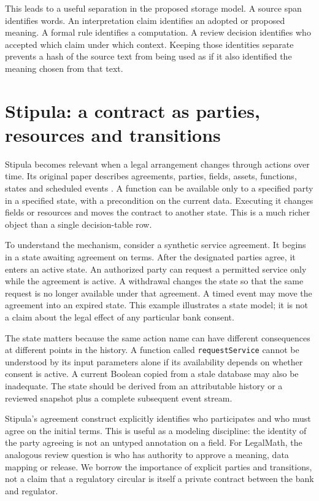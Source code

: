 \documentclass[12pt,a4paper,oneside,openany]{book}
\begin{document}
This leads to a useful separation in the proposed storage model. A source span
identifies words. An interpretation claim identifies an adopted or proposed
meaning. A formal rule identifies a computation. A review decision identifies
who accepted which claim under which context. Keeping those identities
separate prevents a hash of the source text from being used as if it also
identified the meaning chosen from that text.

\section{Stipula: a contract as parties, resources and transitions}
\label{sec:languages-stipula}
Stipula becomes relevant when a legal arrangement changes through actions over
time. Its original paper describes agreements, parties, fields, assets,
functions, states and scheduled events \citep[secs.~3--6]{stipula2021}. A
function can be available only to a specified party in a specified state, with
a precondition on the current data. Executing it changes fields or resources
and moves the contract to another state. This is a much richer object than
a single decision-table row.

To understand the mechanism, consider a synthetic service agreement. It begins
in a state awaiting agreement on terms. After the designated parties agree,
it enters an active state. An authorized party can request a permitted service
only while the agreement is active. A withdrawal changes the state so that
the same request is no longer available under that agreement. A timed event
may move the agreement into an expired state. This example illustrates a state
model; it is not a claim about the legal effect of any particular bank consent.

The state matters because the same action name can have different consequences
at different points in the history. A function called \texttt{requestService}
cannot be understood by its input parameters alone if its availability depends
on whether consent is active. A current Boolean copied from a stale database
may also be inadequate. The state should be derived from an attributable
history or a reviewed snapshot plus a complete subsequent event stream.

Stipula's agreement construct explicitly identifies who participates and who
must agree on the initial terms. This is useful as a modeling discipline:
the identity of the party agreeing is not an untyped annotation on a field.
For LegalMath, the analogous review question is who has authority to approve a
meaning, data mapping or release. We borrow the importance of explicit parties
and transitions, not a claim that a regulatory circular is itself a private
contract between the bank and regulator.
\end{document}
